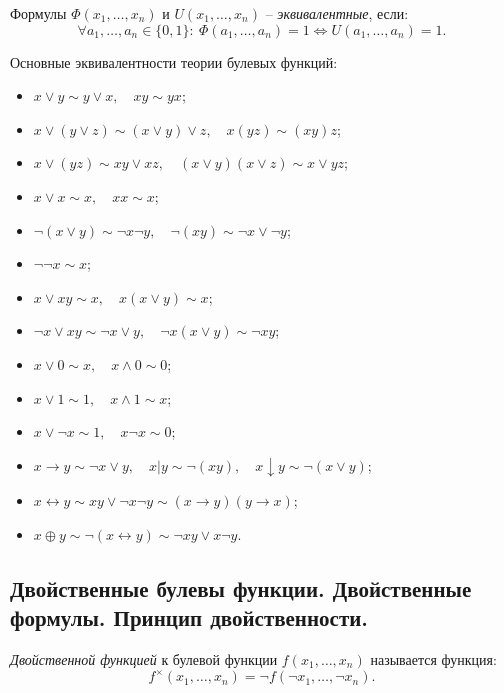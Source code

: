 \begin{definition}
    Формулы $\Phi(x_1,\ldots,x_n)$ и $U(x_1,\ldots,x_n)$ -- \emph{эквивалентные}, если:
    \[
        \forall a_1,\ldots,a_n \in \{0,1\}: \ \Phi(a_1,\ldots,a_n) = 1 \iff U(a_1,\ldots,a_n) = 1.
    \]

    Основные эквивалентности теории булевых функций:
    \begin{itemize}
        \item $x \lor y \sim y \lor x, \quad xy \sim yx$;
        \item $x \lor (y\lor z) \sim (x \lor y) \lor z, \quad x(yz) \sim (xy)z$;
        \item $x \lor (yz) \sim xy \lor xz, \quad (x\lor y)(x\lor z) \sim x \lor yz$;
        \item $x \lor x \sim x, \quad xx \sim x$;
        \item $\lnot(x \lor y) \sim \lnot x\lnot y, \quad \lnot(xy) \sim \lnot x \lor \lnot y$;
        \item $\lnot\lnot x \sim x$;
        \item $x \lor xy \sim x, \quad x(x\lor y)\sim x$;
        \item $\lnot x \lor xy \sim \lnot x\lor y, \quad \lnot x(x \lor y)\sim \lnot xy$;
        \item $x \lor 0 \sim x, \quad x \land 0 \sim 0$;
        \item $x \lor 1 \sim 1, \quad x \land 1 \sim x$;
        \item $x \lor \lnot x \sim 1, \quad x\lnot x \sim 0$;
        \item $x \rightarrow y \sim \lnot x \lor y, \quad x \vert y \sim \lnot(xy), \quad x \downarrow y \sim \lnot(x \lor y)$;
        \item $x \leftrightarrow y \sim xy \lor \lnot x \lnot y \sim (x\rightarrow y)(y\rightarrow x)$;
        \item $x \oplus y \sim \lnot(x \leftrightarrow y) \sim \lnot x y \lor x \lnot y$.
    \end{itemize}
\end{definition}

\subsection{Двойственные булевы функции. Двойственные формулы. Принцип двойственности.}

\begin{definition}
    \emph{Двойственной функцией} к булевой функции $f(x_1,\ldots,x_n)$ называется функция:
    \[
        f^\times(x_1,\ldots,x_n) = \lnot f(\lnot x_1,\ldots, \lnot x_n).
    \]
\end{definition}

